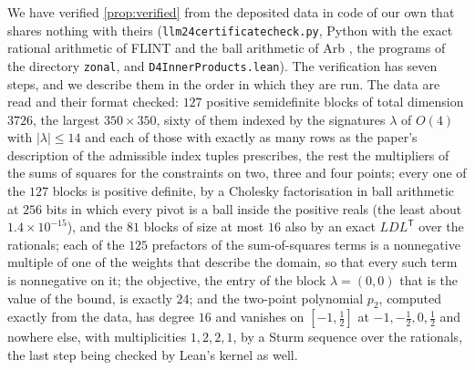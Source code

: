 \documentclass[11pt,reqno]{amsart}
\renewcommand{\_}{\origunderscore\allowbreak}
\numberwithin{equation}{section}
\theoremstyle{plain}
\theoremstyle{definition}
\theoremstyle{remark}
\begin{document}
We have verified \cref{prop:verified} from the deposited data in code of
our own that shares nothing with theirs
(\texttt{llm24\_certificate\_check.py}, Python with the exact rational
arithmetic of FLINT and the ball arithmetic of Arb \cite{Joh17}, the
programs of the directory \texttt{zonal}, and
\texttt{D4InnerProducts.lean}). The verification has seven steps, and
we describe them in the order in which they are run. The data
are read and their format checked: $127$ positive semidefinite blocks
of total dimension $3726$, the largest $350\times350$, sixty of them
indexed by the signatures $\lambda$ of $O(4)$ with $|\lambda|\le14$ and
each of those with exactly as many rows as the paper's description of
the admissible index tuples prescribes, the rest the multipliers of the
sums of squares for the constraints on two, three and four points;
every one of the $127$ blocks is positive definite, by a Cholesky
factorisation in ball arithmetic at $256$ bits in which every pivot is
a ball inside the positive reals (the least about $1.4\times10^{-15}$),
and the $81$ blocks of size at most $16$ also by an exact $LDL^{\mathsf
T}$ over the rationals; each of the $125$ prefactors of the
sum-of-squares terms is a nonnegative multiple of one of the weights
that describe the domain, so that every such term is nonnegative on it;
the objective, the entry of the block $\lambda=(0,0)$ that is the
value of the bound, is exactly $24$; and the two-point polynomial
$p_2$, computed exactly from the data, has degree $16$ and vanishes on
$[-1,\tfrac12]$ at $-1,-\tfrac12,0,\tfrac12$ and nowhere else, with
multiplicities $1,2,2,1$, by a Sturm sequence over the rationals, the
last step being checked by Lean's kernel as well.
\end{document}
